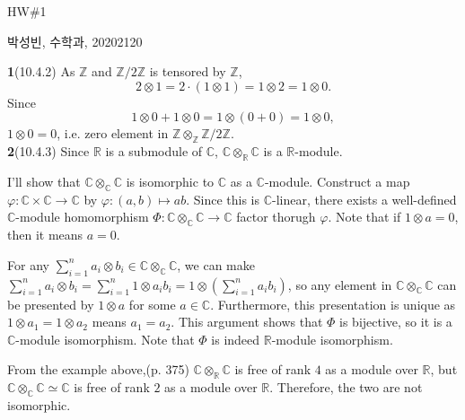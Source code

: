 \documentclass[a4paper, 12pt]{article}
\theoremstyle{Mydefinition}
\theoremstyle{Mytheorem}
\begin{document}
\thispagestyle{myfirstpage}
\begin{center}
	\Large{HW\#1}
\end{center}
박성빈, 수학과, 20202120

\noindent \textbf{1}(10.4.2)
As $\mathbb{Z}$ and $\mathbb{Z}/2\mathbb{Z}$ is tensored by $\mathbb{Z}$,
\begin{equation}
    2\otimes 1 = 2\cdot (1\otimes 1) = 1 \otimes 2 = 1 \otimes 0.
\end{equation}
Since
\begin{equation}
    1 \otimes 0 + 1 \otimes 0 = 1\otimes (0+0) = 1\otimes 0,
\end{equation}
$1\otimes 0 = 0$, i.e. zero element in $\mathbb{Z}\otimes_\mathbb{Z} \mathbb{Z}/2\mathbb{Z}$.\\

\noindent \textbf{2}(10.4.3)
Since $\mathbb{R}$ is a submodule of $\mathbb{C}$, $\mathbb{C}\otimes_\mathbb{R}\mathbb{C}$ is a $\mathbb{R}$-module.

I'll show that $\mathbb{C}\otimes_\mathbb{C}\mathbb{C}$ is isomorphic to $\mathbb{C}$ as a $\mathbb{C}$-module. Construct a map $\varphi:\mathbb{C}\times \mathbb{C}\rightarrow \mathbb{C}$ by $\varphi:(a, b) \mapsto ab$. Since this is $\mathbb{C}$-linear, there exists a well-defined $\mathbb{C}$-module homomorphism $\Phi:\mathbb{C}\otimes_\mathbb{C} \mathbb{C}\rightarrow \mathbb{C}$ factor thorugh $\varphi$. Note that if $1\otimes a = 0$, then it means $a=0$.

For any $\sum_{i=1}^n a_i\otimes b_i\in \mathbb{C}\otimes_\mathbb{C}\mathbb{C}$, we can make $\sum_{i=1}^n a_i\otimes b_i =\sum_{i=1}^n 1\otimes a_ib_i = 1\otimes \left(\sum_{i=1}^n a_ib_i\right)$, so any element in $\mathbb{C}\otimes_\mathbb{C}\mathbb{C}$ can be presented by $1\otimes a$ for some $a\in\mathbb{C}$. Furthermore, this presentation is unique as $1\otimes a_1 = 1\otimes a_2$ means $a_1=a_2$. This argument shows that $\Phi$ is bijective, so it is a $\mathbb{C}$-module isomorphism. Note that $\Phi$ is indeed $\mathbb{R}$-module isomorphism.

From the example above,(p. 375) $\mathbb{C}\otimes_\mathbb{R}\mathbb{C}$ is free of rank $4$ as a module over $\mathbb{R}$, but $\mathbb{C}\otimes_\mathbb{C}\mathbb{C}\simeq \mathbb{C}$ is free of rank $2$ as a module over $\mathbb{R}$. Therefore, the two are not isomorphic.\\
\end{document}

